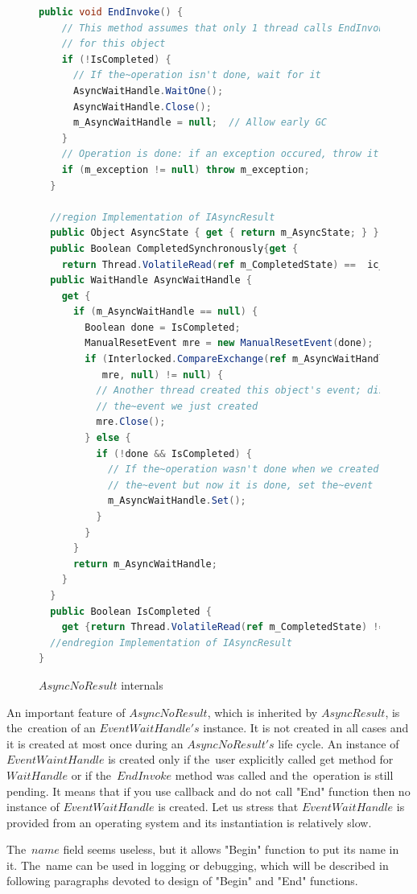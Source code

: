 \begin{figure}[!hbp]	
\begin{lstlisting}[language=cs]
  public void EndInvoke() {
    // This method assumes that only 1 thread calls EndInvoke 
    // for this object
    if (!IsCompleted) {
      // If the~operation isn't done, wait for it
      AsyncWaitHandle.WaitOne();
      AsyncWaitHandle.Close();
      m_AsyncWaitHandle = null;  // Allow early GC
    }      
    // Operation is done: if an exception occured, throw it
    if (m_exception != null) throw m_exception;
  }

  //region Implementation of IAsyncResult
  public Object AsyncState { get { return m_AsyncState; } }
  public Boolean CompletedSynchronously{get { 
    return Thread.VolatileRead(ref m_CompletedState) ==  ic_scs; }}
  public WaitHandle AsyncWaitHandle {
    get {
      if (m_AsyncWaitHandle == null) {
        Boolean done = IsCompleted;
        ManualResetEvent mre = new ManualResetEvent(done);
        if (Interlocked.CompareExchange(ref m_AsyncWaitHandle,
           mre, null) != null) {
          // Another thread created this object's event; dispose 
          // the~event we just created
          mre.Close();
        } else {
          if (!done && IsCompleted) {
            // If the~operation wasn't done when we created 
            // the~event but now it is done, set the~event
            m_AsyncWaitHandle.Set();
          }
        }
      }
      return m_AsyncWaitHandle;
    }
  }
  public Boolean IsCompleted {
    get {return Thread.VolatileRead(ref m_CompletedState) != c_sp; }}
  //endregion Implementation of IAsyncResult
}
\end{lstlisting}
\caption{$AsyncNoResult$ internals} 
\label{noresult}
\end{figure}


  An important feature of $AsyncNoResult$, which is inherited by $AsyncResult$, is the~creation of an $EventWaitHandle's$ instance.
  It is not created in all cases and it is created at most once during an $AsyncNoResult's$ life cycle.
  An instance of $EventWaintHandle$ is created only if the~user explicitly called get method for $WaitHandle$ or
  if the~$EndInvoke$ method was called and the~operation is still pending.
  It means that if you use callback and do not call "End" function then no instance of $EventWaitHandle$ is created.
  Let us stress that $EventWaitHandle$ is provided from an operating system and its instantiation is relatively slow.

  The~$name$ field seems useless, but it allows "Begin" function to put its name in it. 
  The~name can be used in logging or debugging, 
  which will be described in following paragraphs devoted 
  to design of "Begin" and "End" functions.

